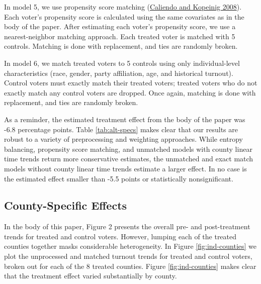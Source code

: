 \documentclass[
  12pt,
]{article}
\begin{document}
In model 5, we use propensity score matching (\protect\hyperlink{ref-Caliendo2008}{Caliendo and Kopeinig 2008}). Each voter's propensity score is calculated using the same covariates as in the body of the paper. After estimating each voter's propensity score, we use a nearest-neighbor matching approach. Each treated voter is matched with 5 controls. Matching is done with replacement, and ties are randomly broken.

In model 6, we match treated voters to 5 controls using only individual-level characteristics (race, gender, party affiliation, age, and historical turnout). Control voters must exactly match their treated voters; treated voters who do not exactly match any control voters are dropped. Once again, matching is done with replacement, and ties are randomly broken.

As a reminder, the estimated treatment effect from the body of the paper was -6.8 percentage points. Table \ref{tab:alt-specs} makes clear that our results are robust to a variety of preprocessing and weighting approaches. While entropy balancing, propensity score matching, and unmatched models with county linear time trends return more conservative estimates, the unmatched and exact match models without county linear time trends estimate a larger effect. In no case is the estimated effect smaller than -5.5 points or statistically nonsignificant.

\newpage
\begin{landscape}
\begin{singlespace}

\end{singlespace}
\end{landscape}

\hypertarget{county-specific-effects}{%
\subsection*{County-Specific Effects}\label{county-specific-effects}}

In the body of this paper, Figure 2 presents the overall pre- and post-treatment trends for treated and control voters. However, lumping each of the treated counties together masks considerable heterogeneity. In Figure \ref{fig:ind-counties} we plot the unprocessed and matched turnout trends for treated and control voters, broken out for each of the 8 treated counties. Figure \ref{fig:ind-counties} makes clear that the treatment effect varied substantially by county.
\end{document}
